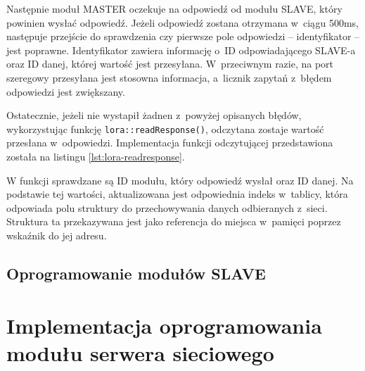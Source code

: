 

Następnie moduł MASTER oczekuje na odpowiedź od modułu SLAVE, który powinien wysłać odpowiedź. Jeżeli odpowiedź zostana
otrzymana w~ciągu 500ms, następuje przejście do sprawdzenia czy pierwsze pole odpowiedzi -- identyfikator -- jest
poprawne. Identyfikator zawiera informację o~ID odpowiadającego SLAVE-a oraz ID danej, której wartość jest przesyłana.
W~przeciwnym razie, na port szeregowy przesyłana jest stosowna informacja, a~licznik zapytań z~błędem odpowiedzi jest
zwiększany.

Ostatecznie, jeżeli nie wystapił żadnen z~powyżej opisanych błędów, wykorzystując funkcję \texttt{lora::readResponse()},
odczytana zostaje wartość przesłana w~odpowiedzi. Implementacja funkcji odczytującej przedstawiona została na listingu
\ref{lst:lora-readresponse}.



W funkcji sprawdzane są ID modułu, który odpowiedź wysłał oraz ID danej. Na podstawie tej wartości, aktualizowana jest
odpowiednia indeks w~tablicy, która odpowiada polu struktury do przechowywania danych odbieranych z~sieci. Struktura ta
przekazywana jest jako referencja do miejsca w~pamięci poprzez wskaźnik do jej adresu.

\subsection{Oprogramowanie modułów SLAVE\label{sect:firmware-slave}}

\section{Implementacja oprogramowania modułu serwera sieciowego\label{sect:firmware-webserver}}